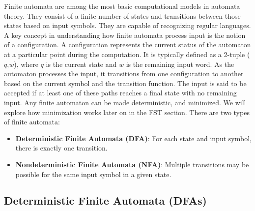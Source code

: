 Finite automata are among the most basic computational models in automata theory. 
They consist of a finite number of states and transitions between those states based on input symbols. They are capable of recognizing regular languages.
A key concept in understanding how finite automata process input is the notion of a configuration. 
A configuration represents the current status of the automaton at a particular point during the computation. 
It is typically defined as a 2-tuple (\(q\),\(w\)), where \(q\) is the current state and \(w\) is the remaining input word. 
As the automaton processes the input, it transitions from one configuration to another based on the current symbol and the transition function.
The input is said to be accepted if at least one of these paths reaches a final state with no remaining input.
Any finite automaton can be made deterministic, and minimized. We will explore how minimization works later on in the FST section.
There are two types of finite automata:
\begin{itemize}
    \item \textbf{Deterministic Finite Automata (DFA)}: For each state and input symbol, there is exactly one transition.
    \item \textbf{Nondeterministic Finite Automata (NFA)}: Multiple transitions may be possible for the same input symbol in a given state.
\end{itemize}

\subsection{Deterministic Finite Automata (DFAs)}

